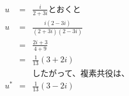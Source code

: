 \documentclass{jsarticle}
\begin{document}
\begin{eqnarray*}
  u &=& \frac{i}{2+3i} \mbox{とおくと}\\
  u &=& \frac{i(2-3i)}{(2+3i)(2-3i)}\\
  &=& \frac{2i+3}{4+9}\\
  &=& \frac{1}{13}(3+2i)\\
  &&\mbox{したがって、複素共役は、}\\
  u^* &=& \frac{1}{13}(3-2i)
\end{eqnarray*}

  
\end{document}
